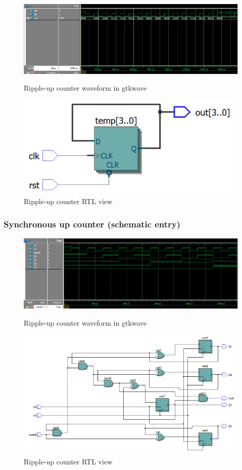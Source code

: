 \documentclass{article}
\begin{document}
\begin{figure}
  \centering
  \includegraphics[width=\linewidth]{figures/waveforms/johnson_wave.png}
  \caption{Ripple-up counter waveform in gtkwave}
  \label{fig:johnson_waveform}

  \includegraphics[width=0.75\linewidth]{figures/RTLs/johnson_RTL.png}
  \caption{Ripple-up counter RTL view}
  \label{fig:johnson_RTL}
\end{figure}
\newpage

\subsubsection{Synchronous up counter (schematic entry)}
\newpage

\begin{figure}
  \centering
  \includegraphics[width=\linewidth]{figures/waveforms/schem_synUp_wave.png}
  \caption{Ripple-up counter waveform in gtkwave}
  \label{fig:schem_synUp_waveform}

  \includegraphics[width=0.75\linewidth]{figures/RTLs/schem_synUp_RTL.png}
  \caption{Ripple-up counter RTL view}
  \label{fig:schem_synUp_RTL}
\end{figure}
\newpage
\end{document}
